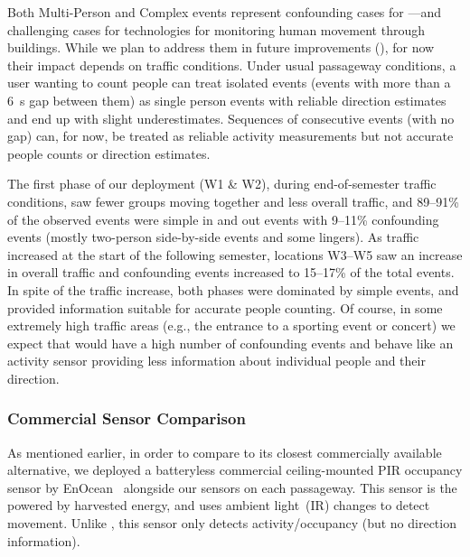 Both Multi-Person and Complex events represent confounding cases for \sysname---and challenging cases for technologies for monitoring human movement through buildings.
While we plan to address them in future improvements (), for now their impact depends on traffic conditions.
Under usual passageway conditions, a user wanting to count people can treat isolated events (events with more than a \SI{6}{\second} gap between them) as single person events with reliable direction estimates and end up with slight underestimates.
Sequences of consecutive events (with no gap) can, for now, be treated as reliable activity measurements but not accurate people counts or direction estimates.


The first phase of our deployment (W1 \& W2), during end-of-semester traffic conditions, saw fewer groups moving together and less overall traffic, and 89--91\% of the observed events were simple in and out events with 9--11\% confounding events (mostly two-person side-by-side events and some lingers).
As traffic increased at the start of the following semester, locations W3--W5 saw an increase in overall traffic and confounding events increased to 15--17\% of the total events.
In spite of the traffic increase, both phases were dominated by simple events, and \sysname provided information suitable for accurate people counting.
Of course, in some extremely high traffic areas (e.g., the entrance to a sporting event or concert) we expect that \sysname would have a high number of confounding events and behave like an activity sensor providing less information about individual people and their direction.  


\subsubsection{Commercial Sensor Comparison}
As mentioned earlier, in order to compare \sysname to its closest commercially available alternative, we deployed a batteryless commercial ceiling-mounted PIR occupancy sensor by EnOcean~\cite{EnOcean} alongside our \sysname sensors on each passageway. 
This sensor is the powered by harvested energy, and uses ambient light~(IR) changes to detect movement.
Unlike \sysname, this sensor only detects activity/occupancy (but no direction information).


